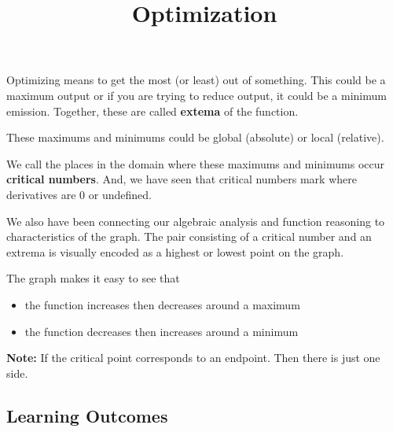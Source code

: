 \documentclass{ximera}
\title{Optimization}
\begin{document}
\begin{abstract}
\end{abstract}
\maketitle








Optimizing means to get the most (or least) out of something.  This could be a maximum output or if you are trying to reduce output, it could be a minimum emission. Together, these are called \textbf{extema} of the function.

These maximums and minimums could be global (absolute) or local (relative).


We call the places in the domain where these maximums and minimums occur \textbf{critical numbers}.  And, we have seen that critical numbers mark where derivatives are $0$ or undefined.


We also have been connecting our algebraic analysis and function reasoning to characteristics of the graph.  The pair consisting of a critical number and an extrema is visually encoded as a highest or lowest point on the graph.

The graph makes it easy to see that 

\begin{itemize}
\item the function increases then decreases around a maximum
\item the function decreases then increases around a minimum
\end{itemize}

\textbf{Note:} If the critical point corresponds to an endpoint.  Then there is just one side.


















\subsection*{Learning Outcomes}
\end{document}
